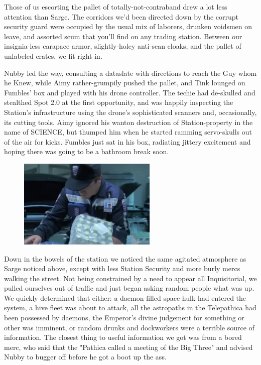 Those of us escorting the pallet of totally-not-contraband drew a lot less attention than Sarge. 
The corridors we'd been directed down by the corrupt security guard were occupied by the usual mix of laborers, drunken voidsmen on leave, and assorted scum that you'll find on any trading station. 
Between our insignia-less carapace armor, slightly-holey anti-scan cloaks, and the pallet of unlabeled crates, we fit right in. 


Nubby led the way, consulting a dataslate with directions to reach the Guy whom he Knew, while Aimy rather-grumpily pushed the pallet, and Tink lounged on Fumbles' box and played with his drone controller. 
The techie had de-skulled and stealthed Spot 2.0 at the first opportunity, and was happily inspecting the Station's infrastructure using the drone's sophisticated scanners and, occasionally, its cutting tools. 
Aimy ignored his wanton destruction of Station-property in the name of SCIENCE, but thumped him when he started ramming servo-skulls out of the air for kicks. 
Fumbles just sat in his box, radiating jittery excitement and hoping there was going to be a bathroom break soon.

\begin{figure}
	\begin{center}
		\includegraphics[width=\figwidth]{pics/14/10.png}
	\end{center}
\end{figure}
Down in the bowels of the station we noticed the same agitated atmosphere as Sarge noticed above, except with less Station Security and more burly mercs walking the street. 
Not being constrained by a need to appear all Inquisitorial, we pulled ourselves out of traffic and just began asking random people what was up. 
We quickly determined that either: 
a daemon-filled space-hulk had entered the system, a hive fleet was about to attack, all the astropaths in the Telepathica had been possessed by daemons, the Emperor's divine judgement for something or other was imminent, or random drunks and dockworkers were a terrible source of information. 
The closest thing to useful information we got was from a bored merc, who said that the "Pathica called a meeting of the Big Three" and advised Nubby to bugger off before he got a boot up the ass.

